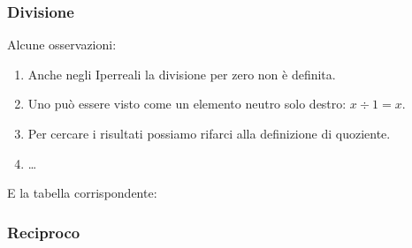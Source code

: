 \subsubsection{Divisione}
\label{subsec:insnum_divisione}

\begin{multicols}{2}
Alcune osservazioni:
\begin{enumerate} [noitemsep]
 \item Anche negli Iperreali la divisione per zero non è definita.
 \item Uno può essere visto come un elemento neutro solo destro: $x \div 
1=x$.
 \item Per cercare i risultati possiamo rifarci alla definizione di 
quoziente.
 \item \dots
\end{enumerate}
E la tabella corrispondente:
\begin{center}
\renewcommand{\arraystretch}{.0}
\end{center}
\end{multicols}

\subsubsection{Reciproco}
\label{subsec:insnum_reciproco}

